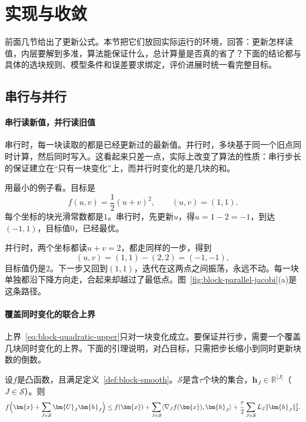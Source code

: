 \section{实现与收敛}
\label{sec:block-implementation}

前面几节给出了更新公式。本节把它们放回实际运行的环境，回答：更新怎样读值，内层要解到多准，算法能保证什么，总计算量是否真的省了？下面的结论都与具体的选块规则、模型条件和误差要求绑定，评价进展时统一看完整目标。

\subsection{串行与并行}
\label{sec:block-parallel}

\paragraph{串行读新值，并行读旧值}
串行时，每一块读取的都是已经更新过的最新值。并行时，多块基于同一个旧点同时计算，然后同时写入。这看起来只差一点，实际上改变了算法的性质：串行步长的保证建立在“只有一块变化”上，而并行时变化的是几块的和。

用最小的例子看。目标是
\[
 f(u,v)=\frac12(u+v)^2,\qquad (u,v)=(1,1).
\]
每个坐标的块光滑常数都是$1$。串行时，先更新$u$，得$u=1-2=-1$，到达$(-1,1)$，目标值$0$，已经最优。

并行时，两个坐标都读$u+v=2$，都走同样的一步，得到
\[
 (u,v)=(1,1)-(2,2)=(-1,-1),
\]
目标值仍是$2$。下一步又回到$(1,1)$，迭代在这两点之间振荡，永远不动。每一块单独都沿下降方向走，合起来却越过了最低点。图~\ref{fig:block-parallel-jacobi}(a)是这条路径。

\paragraph{覆盖同时变化的联合上界}
上界~\eqref{eq:block-quadratic-upper}只对一块变化成立。要保证并行步，需要一个覆盖几块同时变化的上界。下面的引理说明，对凸目标，只需把步长缩小到同时更新块数的倒数。

\begin{lemma}[并行更新的联合上界]
\label{lem:block-parallel-upper}
设$f$是凸函数，且满足定义~\ref{def:block-smooth}。$\mathcal{S}$是含$\tau$个块的集合，$\bm{h}_J\in\mathbb{R}^{\lvert J\rvert}$（$J\in\mathcal{S}$）。则
\begin{equation}
 f\Bigl(\bm{x}+\sum_{J\in\mathcal{S}}\bm{U}_J\bm{h}_J\Bigr)
 \leq f(\bm{x})+\sum_{J\in\mathcal{S}}\langle\nabla_Jf(\bm{x}),\bm{h}_J\rangle+\frac{\tau}{2}\sum_{J\in\mathcal{S}}L_J\lVert\bm{h}_J\rVert_2^2 .
 \label{eq:block-parallel-upper}
\end{equation}
\end{lemma}

